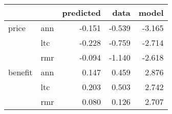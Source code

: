\begin{tabular}{llrrr}
\toprule
        &     &  predicted &   data &  model \\
\midrule
price & ann &     -0.151 & -0.539 & -3.165 \\
        & ltc &     -0.228 & -0.759 & -2.714 \\
        & rmr &     -0.094 & -1.140 & -2.618 \\
benefit & ann &      0.147 &  0.459 &  2.876 \\
        & ltc &      0.203 &  0.503 &  2.742 \\
        & rmr &      0.080 &  0.126 &  2.707 \\
\bottomrule
\end{tabular}
